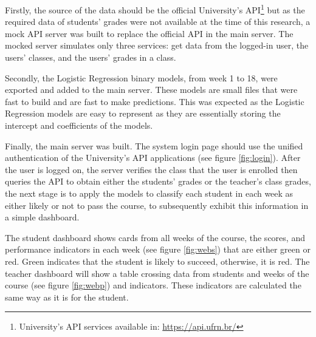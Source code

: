 Firstly, the source of the data should be the official University's API\footnote[1]{\hspace{1mm}University's API services available in: \url{https://api.ufrn.br/}} but as the required data of students' grades were not available at the time of this research, a mock API server was built to replace the official API in the main server. The mocked server simulates only three services: get data from the logged-in user, the users' classes, and the users' grades in a class.

Secondly, the Logistic Regression binary models, from week 1 to 18, were exported and added to the main server. These models are small files that were fast to build and are fast to make predictions. This was expected as the Logistic Regression models are easy to represent as they are essentially storing the intercept and coefficients of the models.

Finally, the main server was built. The system login page should use the unified authentication of the University's API applications (see figure \ref{fig:login}). After the user is logged on, the server verifies the class that the user is enrolled then queries the API to obtain either the students' grades or the teacher's class grades, the next stage is to apply the models to classify each student in each week as either likely or not to pass the course, to subsequently exhibit this information in a simple dashboard.

The student dashboard shows cards from all weeks of the course, the scores, and performance indicators in each week (see figure \ref{fig:webs}) that are either green or red. Green indicates that the student is likely to succeed, otherwise, it is red. The teacher dashboard will show a table crossing data from students and weeks of the course (see figure \ref{fig:webp}) and indicators. These indicators are calculated the same way as it is for the student.


